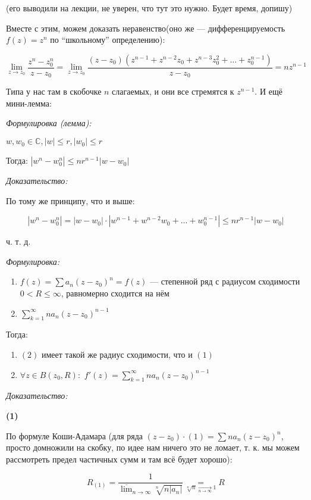 \documentclass{article}
\def\dbl{\,\,}
\begin{document}
(его выводили на лекции, не уверен, что тут это нужно. Будет время, допишу)

Вместе с этим, можем доказать неравенство(оно же --- дифференцируемость $f(z) = z^n$ по ``школьному'' определению):

\[ \lim_{z \rightarrow z_0}{\frac{z^n - z^n_0}{z - z_0}} = \lim_{z \rightarrow z_0}\frac{(z - z_0)(z^{n - 1} + z^{n - 2}z_0 + z^{n - 3}z^2_0 + \ldots + z^{n - 1}_0)}{z - z_0} = nz^{n - 1}\]

Типа у нас там в скобочке $n$ слагаемых, и они все стремятся к $z^{n - 1}$. И ещё мини-лемма:

\textit{Формулировка (лемма):}

$w, w_0 \in \mathbb{C}, |w| \le r, |w_0| \le r$

Тогда: $|w^n - w^n_0| \le nr^{n - 1} |w - w_0|$

\textit{Доказательство:}

По тому же принципу, что и выше: 

\[|w^n - w^n_0| = |w - w_0| \cdot |w^{n - 1} + w^{n - 2}w_0 + \ldots + w^{n - 1}_0| \le nr^{n - 1}|w - w_0|\]

ч. т. д. 

\textit{Формулировка:}

\begin{enumerate}
    \item $f(z) = \sum a_n (z - z_0)^n = f(z)$ --- степенной ряд с радиусом сходимости $0 < R \le \infty$, равномерно сходится на нём
    \item $\sum_{k = 1}^\infty na_n(z - z_0)^{n - 1}$
\end{enumerate}

Тогда:

\begin{enumerate}
    \item $(2)$ имеет такой же радиус сходимости, что и $(1)$
    \item $\forall z \in B(z_0, R): \dbl f'(z) = \sum_{k = 1}^\infty na_n(z - z_0)^{n - 1}$
\end{enumerate}

\textit{Доказательство:}

\textbf{(1)}

По формуле Коши-Адамара (для ряда $(z - z_0) \cdot (1) = \sum na_n(z - z_0)^n$, просто домножили на скобку, по идее нам ничего это не ломает, т. к. мы можем рассмотреть предел частичных сумм и там всё будет хорошо): 

\[R_{(1)} = \frac{1}{\overline{\lim}_{n \rightarrow \infty} \sqrt[n]{n|a_n|}} \underset{\sqrt[n]{n} \underset{n \rightarrow \infty}{\longrightarrow} 1}{=} R\]
\end{document}
